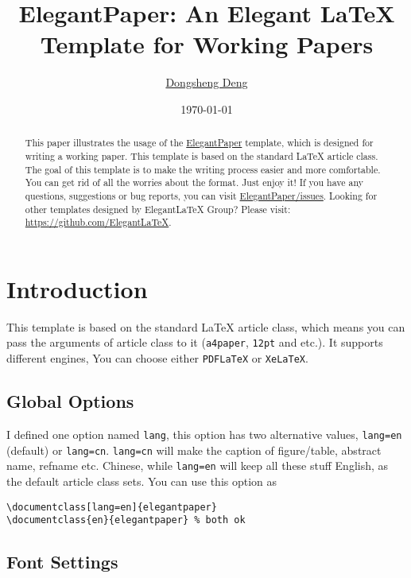 \documentclass[en]{elegantpaper}
\title{ElegantPaper: An Elegant \LaTeX{} Template for Working Papers}
\author{\href{https://ddswhu.me/}{Dongsheng Deng}}
\institute{\href{https://github.com/ElegantLaTeX}{Elegant\LaTeX{} Program}}
\date{\today}
\begin{document}
\maketitle

\begin{abstract}
This paper illustrates the usage of the \href{https://github.com/ElegantLaTeX/ElegantPaper}{ElegantPaper} template, which is designed for writing a working paper. This template is based on the standard \LaTeX{} article class. The goal of this template is to make the writing process easier and more comfortable. You can get rid of all the worries about the format. Just enjoy it! If you have any questions, suggestions or bug reports, you can visit \href{https://github.com/ElegantLaTeX/ElegantPaper/issues}{ElegantPaper/issues}. Looking for other templates designed by Elegant\LaTeX{} Group? Please visit: \href{https://github.com/ElegantLaTeX}{https://github.com/ElegantLaTeX}.
\end{abstract}

\section{Introduction}

This template is based on the standard \LaTeX{} article class, which means you can pass the arguments of article class to it (\lstinline{a4paper}, \lstinline{12pt} and etc.). It supports different engines, You can choose either \lstinline{PDFLaTeX} or \lstinline{XeLaTeX}. 

\subsection{Global Options}
I defined one option named \lstinline{lang}, this option has two alternative values, \lstinline{lang=en} (default) or \lstinline{lang=cn}. \lstinline{lang=cn} will make the caption of figure/table, abstract name, refname etc. Chinese, while \lstinline{lang=en} will keep all these stuff English, as the default article class sets. You can use this option as

\begin{lstlisting}
\documentclass[lang=en]{elegantpaper}
\documentclass{en}{elegantpaper} % both ok
\end{lstlisting}

\subsection{Font Settings}
\end{document}
